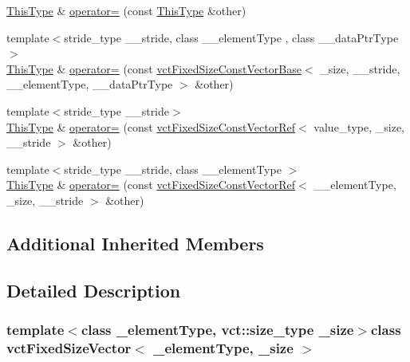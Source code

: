 \begin{DoxyCompactItemize}
\item 
\hyperlink{classvct_fixed_size_const_vector_base_a071063bc4fa43112cc287b2dbef53180}{This\+Type} \& \hyperlink{classvct_fixed_size_vector_a9d3dfdc597e43f3a2a0419ec832035bd}{operator=} (const \hyperlink{classvct_fixed_size_const_vector_base_a071063bc4fa43112cc287b2dbef53180}{This\+Type} \&other)
\item 
{\footnotesize template$<$stride\+\_\+type \+\_\+\+\_\+stride, class \+\_\+\+\_\+element\+Type , class \+\_\+\+\_\+data\+Ptr\+Type $>$ }\\\hyperlink{classvct_fixed_size_const_vector_base_a071063bc4fa43112cc287b2dbef53180}{This\+Type} \& \hyperlink{classvct_fixed_size_vector_aac9630ee0f4155367956b2350399fdb6}{operator=} (const \hyperlink{classvct_fixed_size_const_vector_base}{vct\+Fixed\+Size\+Const\+Vector\+Base}$<$ \+\_\+size, \+\_\+\+\_\+stride, \+\_\+\+\_\+element\+Type, \+\_\+\+\_\+data\+Ptr\+Type $>$ \&other)
\item 
{\footnotesize template$<$stride\+\_\+type \+\_\+\+\_\+stride$>$ }\\\hyperlink{classvct_fixed_size_const_vector_base_a071063bc4fa43112cc287b2dbef53180}{This\+Type} \& \hyperlink{classvct_fixed_size_vector_a49f7d073259cbe575ee73e70b1797cf2}{operator=} (const \hyperlink{classvct_fixed_size_const_vector_ref}{vct\+Fixed\+Size\+Const\+Vector\+Ref}$<$ value\+\_\+type, \+\_\+size, \+\_\+\+\_\+stride $>$ \&other)
\item 
{\footnotesize template$<$stride\+\_\+type \+\_\+\+\_\+stride, class \+\_\+\+\_\+element\+Type $>$ }\\\hyperlink{classvct_fixed_size_const_vector_base_a071063bc4fa43112cc287b2dbef53180}{This\+Type} \& \hyperlink{classvct_fixed_size_vector_a28a9d97591d50f1acf3edfe6e788e849}{operator=} (const \hyperlink{classvct_fixed_size_const_vector_ref}{vct\+Fixed\+Size\+Const\+Vector\+Ref}$<$ \+\_\+\+\_\+element\+Type, \+\_\+size, \+\_\+\+\_\+stride $>$ \&other)
\end{DoxyCompactItemize}

\subsection*{Additional Inherited Members}


\subsection{Detailed Description}
\subsubsection*{template$<$class \+\_\+element\+Type, vct\+::size\+\_\+type \+\_\+size$>$class vct\+Fixed\+Size\+Vector$<$ \+\_\+element\+Type, \+\_\+size $>$}

